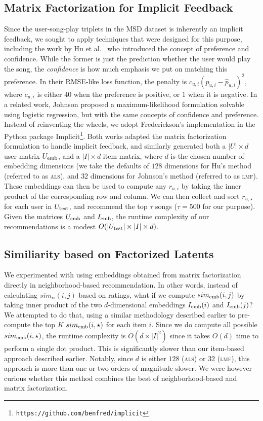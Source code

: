 \documentclass[conference]{IEEEtran}
\begin{document}
\subsection{Matrix Factorization for Implicit Feedback}

Since the user-song-play triplets in the MSD dataset is inherently an
implicit
feedback, we sought to apply techniques that were designed for this purpose,
including the work by Hu et al.~\cite{hu2008collaborative} who introduced
the concept of preference and confidence. While the former is
just the prediction whether the user would play the song, the
{\em confidence} is how much emphasis
we put on matching this preference. In their RMSE-like loss function,
the penalty is $c_{u,i}(p_{u,i} - \hat{p}_{u,i})^2$, where $c_{u,i}$ is
either $40$ when the preference is positive, or $1$ when it is negative.
In a related work,
Johnson \cite{johnson2014logistic} proposed a maximum-likelihood
 formulation solvable using logistic regression,
but with the same concepts of confidence and preference.
Instead of reinventing the wheels, we adopt Frederickson's implementation in
the Python package
Implicit\footnote{\texttt{https://github.com/benfred/implicit}}.
Both works adapted the
matrix factorization formulation to handle implicit feedback, and similarly
generated both a $|U|\times d$ user matrix $U_{\rm emb}$, and
a $|I|\times d$ item matrix, where $d$ is the chosen number of
embedding dimensions
(we take the defaults of $128$ dimensions for Hu's method (referred to as
\textsc{als}), and
$32$ dimensions for Johnson's method (referred to as \textsc{lmf}).
These embeddings can
then be used to compute any $r_{u,i}$ by taking the inner product of the
corresponding row and column. We can then collect and sort $r_{u,\star}$
for each user in $U_{\rm test}$,
and recommend the top $\tau$ songs ($\tau = 500$ for our
purpose). Given the matrices $U_{\rm emb}$ and $I_{\rm emb}$,
the runtime complexity of our recommendations is a modest
$O(|U_{\rm test}| \times |I| \times d)$.

\subsection{Similiarity based on Factorized Latents}

We experimented with using embeddings obtained from matrix factorization
directly in neighborhood-based recommendation. In other words,
instead of calculating $sim_{\alpha}(i,j)$ based on ratings, what if we
compute $sim_{\rm emb}(i,j)$ by taking inner product of
the two $d$-dimensional embeddings $I_{\rm emb}(i)$ and
$I_{\rm emb}(j)$? We attempted to do that, using a similar methodology
described earlier to pre-compute the top $K$ $sim_{\rm emb}(i,\star)$ for
each item $i$. Since we do compute all possible
$sim_{\rm emb}(i,\star)$, the runtime complexity is $O(d\times |I|^2)$
since it takes $O(d)$ time to perform a single dot product. This is
significantly slower than our item-based approach described earlier. Notably,
since $d$ is either $128$ (\textsc{als}) or $32$ (\textsc{lmf}),
this approach is more than one or two orders of magnitude slower.
We were however curious whether this method combines the best of
neighborhood-based and matrix factorization.
\end{document}
